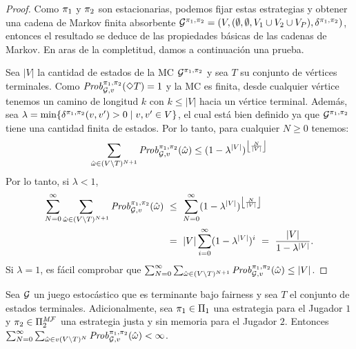 \begin{proof}
  Como $\pi_{1}$ y $\pi_{2}$ son estacionarias, podemos fijar estas estrategias
  y obtener una cadena de Markov finita absorbente
  $\mathcal{G}^{\pi_{1},\pi_{2}} = (V, (\emptyset,\emptyset, V_1 \cup V_2 \cup V_P), \delta^{\pi_{1}, \pi_{2}})$,
  entonces el resultado se deduce de las propiedades básicas de las cadenas de Markov. En aras de la completitud, damos a continuación una prueba.
  
  Sea $|V|$ la cantidad de estados de la MC
  $\mathcal{G}^{\pi_{1},\pi_{2}}$ y sea $T$ su conjunto de vértices terminales.
  Como $\mathit{Prob}^{\pi_{1}, \pi_{2}}_{\mathcal{G},v}(\Diamond T) = 1$
  y la MC es finita, desde cualquier vértice tenemos un camino de longitud $k$
  con $k \leq|V|$ hacia un vértice terminal.
  Además, sea
  $\lambda = \min \{ \delta^{\pi_{1},\pi_{2}}(v,v') > 0 \mid v,v' \in V \}$,
  el cual está bien definido ya que $\mathcal{G}^{\pi_{1},\pi_{2}}$ tiene una cantidad finita de estados.
  Por lo tanto, para cualquier $N\geq 0$ tenemos:
  \[
  \sum_{\hat{\omega} \in (V \setminus T)^{N+1}} \mathit{Prob}^{\pi_{1}, \pi_{2}}_{\mathcal{G},v}(\hat{\omega}) \leq (1 - \lambda^{|V|})^{\left\lfloor{\frac{N}{|V|}}\right\rfloor}
  \]
  Por lo tanto, si $\lambda<1$,
  \begin{align*}
    \sum^\infty_{N=0}\sum_{\hat{\omega} \in (V \setminus T)^{N+1}} \Prob{\strat{1}}{\strat{2}}_{\StochG,v}(\hat{\omega}) & \ \leq \ \sum^{\infty}_{N=0}(1 - \lambda^{|V|})^{\left\lfloor{\frac{N}{|V|}}\right\rfloor} \\
    & \ = \ {|V|}\sum^{\infty}_{i=0}(1 - \lambda^{|V|})^i \ = \ \frac{|V|}{1 - \lambda^{|V|}}.
  \end{align*}
  Si $\lambda = 1$, es fácil comprobar que
  $\sum^\infty_{N=0}\sum_{\hat{\omega} \in (V \setminus T)^{N+1}} \mathit{Prob}^{\pi_{1}, \pi_{2}}_{\mathcal{G},v}(\hat{\omega}) \leq {|V|}$.
  \qedhere
\end{proof}

\begin{lemma}\label{lm:games-are-bounded}
  Sea $\mathcal{G}$ un juego estocástico que es terminante bajo fairness
  y sea $T$ el conjunto de estados terminales. Adicionalmente, sea
  $\pi_{1} \in \Pi_{1}$ una estrategia para el Jugador $1$ y
  $\pi_{2} \in \Pi^{\textit{M}\mathcal{F}}_{2}$ una estrategia justa y sin memoria para el Jugador $2$.  Entonces
  $\sum^\infty_{N=0} \sum_{\hat{\omega} \in v(V \setminus T)^N} \mathit{Prob}^{\pi_{1}, \pi_{2}}_{\mathcal{G},v}(\hat{\omega}) < \infty$.
\end{lemma}

